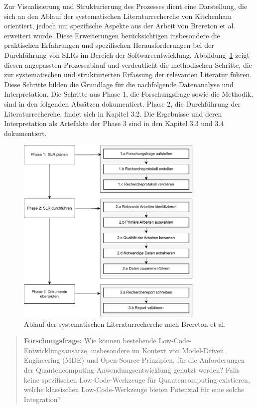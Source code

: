 Zur Visualisierung und Strukturierung des Prozesses dient eine Darstellung, die sich an den Ablauf der systematischen 
Literaturrecherche von Kitchenham orientiert, jedoch um spezifische Aspekte aus der Arbeit von 
Brereton et al.~\cite{brereton2007lessons} erweitert wurde. Diese Erweiterungen berücksichtigen insbesondere die 
praktischen Erfahrungen und spezifischen Herausforderungen bei der Durchführung von SLRs im Bereich der Softwareentwicklung. 
Abbildung~\ref{fig:slr_kitchenham} zeigt diesen angepassten Prozessablauf und verdeutlicht die methodischen Schritte, die 
zur systematischen und strukturierten Erfassung der relevanten Literatur führen. Diese Schritte bilden die Grundlage für 
die nachfolgende Datenanalyse und Interpretation. Die Schritte aus Phase 1, die Forschungsfrage sowie die Methodik, sind 
in den folgenden Absätzen dokumentiert. Phase 2, die Durchführung der Literaturrecherche, findet sich in Kapitel 3.2. 
Die Ergebnisse und deren Interpretation als Artefakte der Phase 3 sind in den Kapitel 3.3 und 3.4 dokumentiert. 

\begin{figure}[h!]
    \centering
    \includegraphics[width=0.8\textwidth]{graphics/slr_kitchenham_ablauf_new.pdf}
    \caption{Ablauf der systematischen Literaturrecherche nach Brereton et al.~\cite{brereton2007lessons}}
\label{fig:slr_kitchenham}
\end{figure}

\begin{quote}
    \textbf{Forschungsfrage:} Wie können bestehende Low-Code-Entwicklungsansätze, insbesondere im Kontext von 
    Model-Driven Engineering (MDE) und Open-Source-Prinzipien, für die Anforderungen der Quantencomputing-Anwendungsentwicklung 
    genutzt werden? Falls keine spezifischen Low-Code-Werkzeuge für Quantencomputing existieren, welche klassischen Low-Code-Werkzeuge 
    bieten Potenzial für eine solche Integration?
\label{research_question}
\end{quote}

